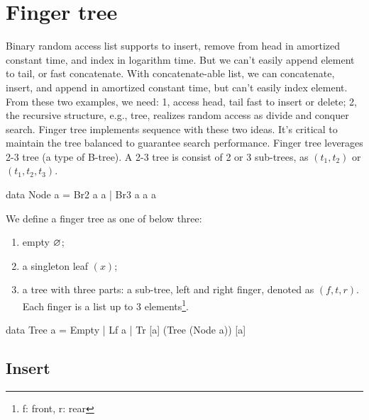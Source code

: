\documentclass[b5paper]{article}
\begin{document}

\section{Finger tree}

Binary random access list supports to insert, remove from head in amortized constant time, and index in logarithm time. But we can't easily append element to tail, or fast concatenate. With concatenate-able list, we can concatenate, insert, and append in amortized constant time, but can't easily index element. From these two examples, we need: 1, access head, tail fast to insert or delete; 2, the recursive structure, e.g., tree, realizes random access as divide and conquer search. Finger tree\cite{finger-tree-1977} implements sequence with these two ideas\cite{finger-tree-2006}. It's critical to maintain the tree balanced to guarantee search performance. Finger tree leverages 2-3 tree (a type of B-tree). A 2-3 tree is consist of 2 or 3 sub-trees, as $(t_1, t_2)$ or $(t_1, t_2, t_3)$.

\lstset{frame = single}
\begin{Haskell}
data Node a = Br2 a a | Br3 a a a
\end{Haskell}

We define a finger tree as one of below three:

\begin{enumerate}
\item empty $\varnothing$;
\item a singleton leaf $(x)$;
\item a tree with three parts: a sub-tree, left and right finger, denoted as $(f, t, r)$. Each finger is a list up to 3 elements\footnote{f: front, r: rear}.
\end{enumerate}

\begin{Haskell}
data Tree a = Empty
            | Lf a
            | Tr [a] (Tree (Node a)) [a]
\end{Haskell}

\subsection{Insert}
\end{document}

